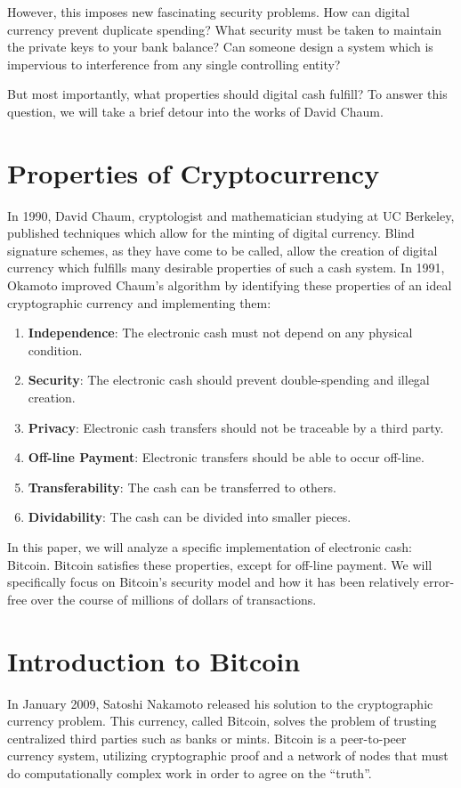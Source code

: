 \documentclass{report}
\begin{document}
However, this imposes new fascinating security problems. How can digital
currency prevent duplicate spending? What security must be taken to maintain the
private keys to your bank balance? Can someone design a system which is
impervious to interference from any single controlling entity?

But most importantly, what properties should digital cash fulfill? To answer
this question, we will take a brief detour into the works of David Chaum.

\section*{Properties of Cryptocurrency}
In 1990, David Chaum, cryptologist and mathematician studying at UC Berkeley,
published techniques which allow for the minting of digital
currency.\cite{Chaum:Cash} Blind signature schemes, as they have come to be
called, allow the creation of digital currency which fulfills many desirable
properties of such a cash system. In 1991, Okamoto improved Chaum's algorithm
by identifying these properties of an ideal cryptographic currency and
implementing them:\cite{Okamoto:Cash}

\begin{enumerate}
\item \textbf{Independence}: The electronic cash must not depend on any physical condition.
\item \textbf{Security}: The electronic cash should prevent double-spending and illegal creation.
\item \textbf{Privacy}: Electronic cash transfers should not be traceable by a third party.
\item \textbf{Off-line Payment}: Electronic transfers should be able to occur off-line.
\item \textbf{Transferability}: The cash can be transferred to others.
\item \textbf{Dividability}: The cash can be divided into smaller pieces.
\end{enumerate}

In this paper, we will analyze a specific implementation of electronic cash:
Bitcoin. Bitcoin satisfies these properties, except for off-line payment. We
will specifically focus on Bitcoin's security model and how it has been
relatively error-free over the course of millions of dollars of transactions.

\section*{Introduction to Bitcoin}
In January 2009\cite{wiki:bitcoin}, Satoshi Nakamoto released his solution to the cryptographic currency problem. This currency, called Bitcoin, solves the problem of trusting centralized third parties such as banks or mints. Bitcoin is a peer-to-peer currency system, utilizing cryptographic proof and a network of nodes that must do computationally complex work in order to agree on the ``truth''\cite{Nakamoto:Bitcoin}.
\end{document}
